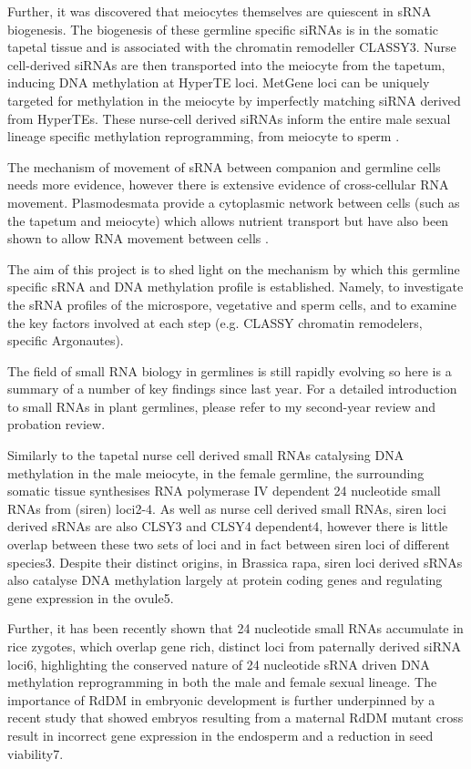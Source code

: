 Further, it was discovered that meiocytes themselves are quiescent in sRNA biogenesis. The biogenesis of these germline specific siRNAs is in the somatic tapetal tissue and is associated with the chromatin remodeller CLASSY3. Nurse cell-derived siRNAs are then transported into the meiocyte from the tapetum, inducing DNA methylation at HyperTE loci. MetGene loci can be uniquely targeted for methylation in the meiocyte by imperfectly matching siRNA derived from HyperTEs. These nurse-cell derived siRNAs inform the entire male sexual lineage specific methylation reprogramming, from meiocyte to sperm \citep{RN187}.

The mechanism of movement of sRNA between companion and germline cells needs more evidence, however there is extensive evidence of cross-cellular RNA movement. Plasmodesmata provide a cytoplasmic network between cells (such as the tapetum and meiocyte) which allows nutrient transport but have also been shown to allow RNA movement between cells \citep{RN130,RN132,RN128}.

The aim of this project is to shed light on the mechanism by which this germline specific sRNA and DNA methylation profile is established. Namely, to investigate the sRNA profiles of the microspore, vegetative and sperm cells, and to examine the key factors involved at each step (e.g. CLASSY chromatin remodelers, specific Argonautes).  

The field of small RNA biology in germlines is still rapidly evolving so here is a summary of a number of key findings since last year. For a detailed introduction to small RNAs in plant germlines, please refer to my second-year review and probation review.

Similarly to the tapetal nurse cell derived small RNAs catalysing DNA methylation in the male meiocyte, in the female germline, the surrounding somatic tissue synthesises RNA polymerase IV dependent 24 nucleotide small RNAs from (siren) loci2-4. As well as nurse cell derived small RNAs, siren loci derived sRNAs are also CLSY3 and CLSY4 dependent4, however there is little overlap between these two sets of loci and in fact between siren loci of different species3. Despite their distinct origins, in Brassica rapa, siren loci derived sRNAs also catalyse DNA methylation largely at protein coding genes and regulating gene expression in the ovule5. 

Further, it has been recently shown that 24 nucleotide small RNAs accumulate in rice zygotes, which overlap gene rich, distinct loci from paternally derived siRNA loci6, highlighting the conserved nature of 24 nucleotide sRNA driven DNA methylation reprogramming in both the male and female sexual lineage. The importance of RdDM in embryonic development is further underpinned by a recent study that showed embryos resulting from a maternal RdDM mutant cross result in incorrect gene expression in the endosperm and a reduction in seed viability7.
